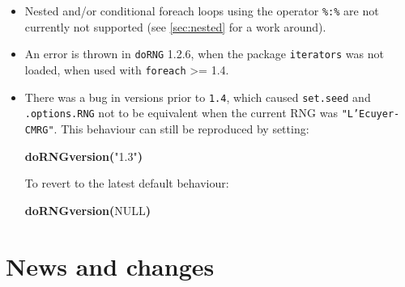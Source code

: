 \documentclass[a4paper,12pt]{article}\usepackage{graphicx, color}
\makeatletter
\newcommand{\hlfunctioncall}[1]{\textcolor[rgb]{0.501960784313725,0,0.329411764705882}{\textbf{#1}}}%
\newcommand{\hlstring}[1]{\textcolor[rgb]{0.6,0.6,1}{#1}}%
\newcommand{\hlkeyword}[1]{\textcolor[rgb]{0,0,0}{\textbf{#1}}}%
\newenvironment{kframe}{%
 \def\FrameCommand##1{\hskip\@totalleftmargin \hskip-\fboxsep
 \colorbox{shadecolor}{##1}\hskip-\fboxsep
     \hskip-\linewidth \hskip-\@totalleftmargin \hskip\columnwidth}%
 \MakeFramed {\advance\hsize-\width
   \@totalleftmargin\z@ \linewidth\hsize
   \@setminipage}}%
 {\par\unskip\endMakeFramed}
\newenvironment{knitrout}{}{} %
\renewenvironment{knitrout}{\begin{footnotesize}}{\end{footnotesize}}
\let\code=\texttt
\makeatother
\begin{document}
\begin{itemize}
\item Nested and/or conditional foreach loops using the operator \code{\%:\%} are not 
currently not supported (see \cref{sec:nested} for a work around).
\item An error is thrown in \code{doRNG} 1.2.6, when the package \code{iterators} was not loaded, when used with 
\code{foreach} >= 1.4.
\item There was a bug in versions prior to \code{1.4}, which caused \code{set.seed} and 
\code{.options.RNG} not to be equivalent when the current RNG was \code{"L'Ecuyer-CMRG"}.
This behaviour can still be reproduced by setting:
\begin{knitrout}
\color{fgcolor}\begin{kframe}
\begin{flushleft}
\ttfamily\noindent
\hlfunctioncall{doRNGversion}\hlkeyword{(}\hlstring{"{}1.3"{}}\hlkeyword{)}\mbox{}
\normalfont
\end{flushleft}
\end{kframe}
\end{knitrout}

To revert to the latest default behaviour:
\begin{knitrout}
\color{fgcolor}\begin{kframe}
\begin{flushleft}
\ttfamily\noindent
\hlfunctioncall{doRNGversion}\hlkeyword{(}NULL\hlkeyword{)}\mbox{}
\normalfont
\end{flushleft}
\end{kframe}
\end{knitrout}

\end{itemize} 

\section{News and changes}
\end{document}
